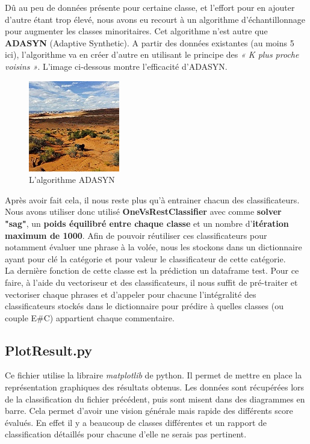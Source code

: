 \documentclass[12pt ,a4paper ]{article}
\begin{document}
\begin{multicols}{2}
Dû au peu de données présente pour certaine classe, et l'effort pour en ajouter d'autre étant trop élevé, nous avons eu recourt à un algorithme d'échantillonnage pour augmenter les classes minoritaires. Cet algorithme n'est autre que \textbf{ADASYN} (Adaptive Synthetic). A partir des données existantes (au moins 5 ici), l'algorithme va en créer d'autre en utilisant le principe des \textit{« K plus proche voisins »}. L'image ci-dessous montre l'efficacité d'ADASYN.\\

\begin{figure}[H]
    \begin{center}
        \includegraphics[scale=0.62]{3808.jpg}
    \end{center}
\caption{\small{L'algorithme ADASYN}}
\end{figure}

Après avoir fait cela, il nous reste plus qu'à entrainer chacun des classificateurs. Nous avons utiliser donc utilisé \textbf{OneVsRestClassifier} avec comme\textbf{ solver "sag"}, un \textbf{poids équilibré entre chaque classe} et un nombre d'\textbf{itération maximum de 1000}. Afin de pouvoir réutiliser ces classificateurs pour notamment évaluer une phrase à la volée, nous les stockons dans un dictionnaire ayant pour clé la catégorie et pour valeur le classificateur de cette catégorie.\\

La dernière fonction de cette classe est la prédiction un dataframe test. Pour ce faire, à l'aide du vectoriseur et des classificateurs, il nous suffit de pré-traiter et vectoriser chaque phrases et d'appeler pour chacune l'intégralité des classificateurs stockés dans le dictionnaire pour prédire à quelles classes (ou couple E\#C) appartient chaque commentaire.

\subsection{PlotResult.py}
Ce fichier utilise la libraire \textit{matplotlib} de python. Il permet de mettre en place la représentation graphiques des résultats obtenus. Les données sont récupérées lors de la classification du fichier précédent, puis sont misent dans des diagrammes en barre. Cela permet d'avoir une vision générale mais rapide des différents score évalués. En effet il y a beaucoup de classes différentes et un rapport de classification détaillés pour chacune d'elle ne serais pas pertinent.


\end{multicols}
\end{document}
